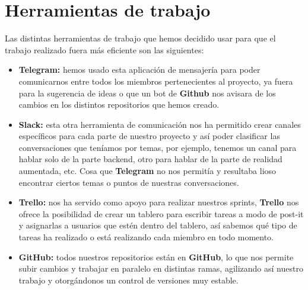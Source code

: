 \section{Herramientas de trabajo}
\label{makereference4.5}
Las distintas herramientas de trabajo que hemos decidido usar para que el trabajo realizado fuera más eficiente son las siguientes:
\begin{itemize}
    \item \textbf{Telegram:} hemos usado esta aplicación de mensajería para poder comunicarnos entre todos los miembros pertenecientes al proyecto, ya fuera para la sugerencia de ideas o que un bot de \textbf{Github} nos avisara de los cambios en los distintos repositorios que hemos creado. 
    \item \textbf{Slack:} esta otra herramienta de comunicación nos ha permitido crear canales específicos para cada parte de nuestro proyecto y así poder clasificar las conversaciones que teníamos por temas, por ejemplo, tenemos un canal para hablar solo de la parte backend, otro para hablar de la parte de realidad aumentada, etc. Cosa que \textbf{Telegram} no nos permitía y resultaba lioso encontrar ciertos temas o puntos de nuestras conversaciones. 
    \item \textbf{Trello:} nos ha servido como apoyo para realizar nuestros sprints, \textbf{Trello} nos ofrece la posibilidad de crear un tablero para escribir tareas a modo de post-it y asignarlas a usuarios que estén dentro del tablero, así sabemos qué tipo de tareas ha realizado o está realizando cada miembro en todo momento.
    \item \textbf{GitHub:} todos nuestros repositorios están en \textbf{GitHub}, lo que nos permite subir cambios y trabajar en paralelo en distintas ramas, agilizando así nuestro trabajo y otorgándonos un control de versiones muy estable.
\end{itemize}

